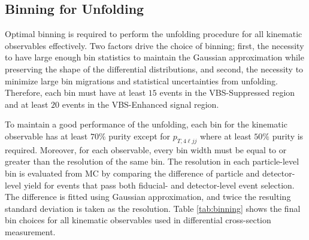 \subsection{Binning for Unfolding}
\label{subsec:Binning}
Optimal binning is required to perform the unfolding procedure for all kinematic observables effectively. Two factors drive the choice of binning; first, the necessity to have large enough bin statistics to maintain the Gaussian approximation while preserving the shape of the differential distributions, and second, the necessity to minimize large bin migrations and statistical uncertainties from unfolding. Therefore, each bin must have at least $15$ events in the VBS-Suppressed region and at least $20$ events in the VBS-Enhanced signal region. 

To maintain a good performance of the unfolding, each bin for the kinematic observable has at least $70\%$ purity except for $p_{T,4\ell jj}$ where at least $50\%$ purity is required. Moreover, for each observable, every bin width must be equal to or greater than the resolution of the same bin. The resolution in each particle-level bin is evaluated from MC by comparing the difference of particle and detector-level yield for events that pass both fiducial- and detector-level event selection. The difference is fitted using Gaussian approximation, and twice the resulting standard deviation is taken as the resolution. Table \ref{tab:binning} shows the final bin choices for all kinematic observables used in differential cross-section measurement.

